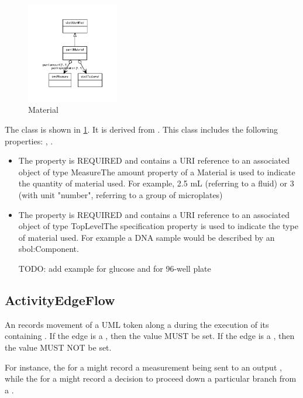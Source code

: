 \begin{figure}[h!]%
\centering%
\includegraphics[width=0.35893617021276597\textwidth]{paml_classes/Material_abstraction_hierarchy.pdf}%
\caption{Material}%
\label{fig:Material}%
\end{figure}

%
The  class is shown in \ref{fig:Material}. It is derived from .%
This class includes the following properties: , . %
\begin{itemize}%
\item%
The  property is REQUIRED and contains a URI reference to an associated object of type MeasureThe amount property of a Material is used to indicate the quantity of material used.
        For example, 2.5 mL (referring to a fluid) or 3 (with unit "number", referring to a group of microplates)%
\item%
The  property is REQUIRED and contains a URI reference to an associated object of type TopLevelThe specification property is used to indicate the type of material used.
        For example a DNA sample would be described by an sbol:Component.

        TODO: add example for glucose and for 96-well plate%
\end{itemize}%
\subsection{ActivityEdgeFlow}%
\label{sec:paml:ActivityEdgeFlow}%
An  records  movement of a UML token along a  during the
        execution of its containing . If the edge is a , then the value MUST be set.
        If the edge is a , then the value MUST NOT be set.

        For instance, the  for a  might record a measurement being sent to an output
        , while the  for a  might record a decision to proceed down a
        particular branch from a .

